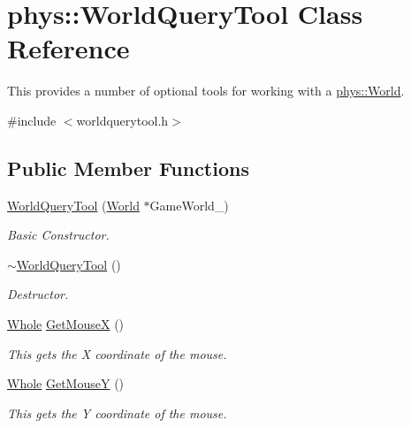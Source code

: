 \hypertarget{classphys_1_1WorldQueryTool}{
\section{phys::WorldQueryTool Class Reference}
\label{d8/d69/classphys_1_1WorldQueryTool}
}


This provides a number of optional tools for working with a \hyperlink{classphys_1_1World}{phys::World}.  




{\ttfamily \#include $<$worldquerytool.h$>$}

\subsection*{Public Member Functions}
\begin{DoxyCompactItemize}
\item 
\hyperlink{classphys_1_1WorldQueryTool_a6b156ab7ea6236402c40467da7f11c0d}{WorldQueryTool} (\hyperlink{classphys_1_1World}{World} $\ast$GameWorld\_\-)
\begin{DoxyCompactList}\small\item\em Basic Constructor. \item\end{DoxyCompactList}\item 
\hyperlink{classphys_1_1WorldQueryTool_ace36ffebcabbbf0553c517820bc636c9}{$\sim$WorldQueryTool} ()
\begin{DoxyCompactList}\small\item\em Destructor. \item\end{DoxyCompactList}\item 
\hyperlink{namespacephys_a460f6bc24c8dd347b05e0366ae34f34a}{Whole} \hyperlink{classphys_1_1WorldQueryTool_a55721f152fb117fdfb8bc6d20af6b1dc}{GetMouseX} ()
\begin{DoxyCompactList}\small\item\em This gets the X coordinate of the mouse. \item\end{DoxyCompactList}\item 
\hyperlink{namespacephys_a460f6bc24c8dd347b05e0366ae34f34a}{Whole} \hyperlink{classphys_1_1WorldQueryTool_ac2d8517db7305157c1393320f434751b}{GetMouseY} ()
\begin{DoxyCompactList}\small\item\em This gets the Y coordinate of the mouse. \item\end{DoxyCompactList}\item 

\end{DoxyCompactItemize}
